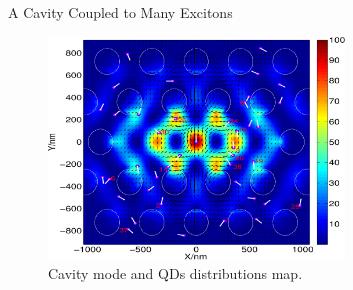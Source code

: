 \documentclass{beamer}
\begin{document}
\begin{frame}{A Cavity Coupled to Many Excitons}
\begin{figure}[htp]%
\centering
\begin{center}
\includegraphics[width=0.7\textwidth]{./Figs/QDmode}
\end{center}
\caption[Cavity mode and 41-QD distribution in a PC cavity.]{Cavity mode and QDs distributions map. }
\label{QDmode}
\end{figure}
\end{frame}
\end{document}
